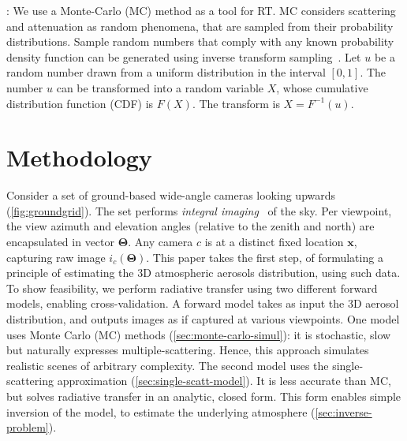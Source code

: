 \documentclass[10pt,letterpaper]{article}
\begin{document}
: We use a Monte-Carlo (MC)
method as a tool for RT. MC considers scattering and attenuation as
random phenomena, that are sampled from their probability
distributions.  Sample random numbers that comply with any known
probability density function can be generated using inverse transform
sampling~\cite{devroye1986sample}. Let $u$ be a random number drawn
from a uniform distribution in the interval $[0,1]$. The number $u$
can be transformed into a random variable $X$, whose cumulative
distribution function (CDF) is $F(X)$. The transform is $X =
F^{-1}(u)$.



\section{Methodology}
\label{sec:methodology}

Consider a set of ground-based wide-angle cameras
looking upwards (\cref{fig:groundgrid}). The set performs {\em
  integral imaging}~\cite{Hong2004} of the sky. Per viewpoint, the
view azimuth and elevation angles (relative to the zenith and north)
are encapsulated in vector ${\bm{\Theta}}$. Any camera $c$ is at a
distinct fixed location ${\bm x}$, capturing raw image
$i_c({\bm{\Theta}})$. This paper takes the first step, of formulating
a principle of estimating the 3D atmospheric aerosols distribution,
using such data. To show feasibility, we perform radiative transfer
using two different forward models, enabling cross-validation.  A
forward model takes as input the 3D aerosol distribution, and outputs
images as if captured at various viewpoints. One model uses Monte
Carlo (MC) methods (\cref{sec:monte-carlo-simul}): it is stochastic,
slow but naturally expresses multiple-scattering. Hence, this approach
simulates realistic scenes of arbitrary complexity.  The second model
uses the single-scattering approximation
(\cref{sec:single-scatt-model}). It is less accurate than MC, but
solves radiative transfer in an analytic, closed form. This form
enables simple inversion of the model, to estimate the underlying
atmosphere (\cref{sec:inverse-problem}).

\end{document}
